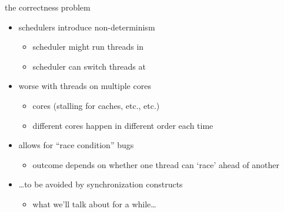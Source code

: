 \begin{frame}{the correctness problem}
\begin{itemize}
\item schedulers introduce non-determinism
    \begin{itemize}
    \item scheduler might run threads in 
    \item scheduler can switch threads at 
    \end{itemize}
\item worse with threads on multiple cores
    \begin{itemize}
    \item cores  (stalling for caches, etc., etc.)
    \item different cores happen in different order each time
    \end{itemize}
\vspace{.5cm}
\item allows for ``race condition'' bugs
    \begin{itemize}
    \item outcome depends on whether one thread can `race' ahead of another
    \end{itemize}
\item \ldots to be avoided by synchronization constructs
    \begin{itemize}
    \item what we'll talk about for a while\ldots
    \end{itemize}
\end{itemize}
\end{frame}
